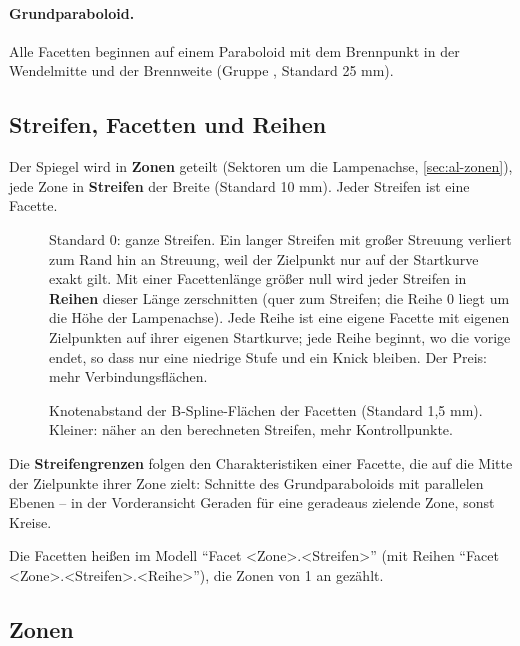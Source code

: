 \paragraph{Grundparaboloid.} Alle Facetten beginnen auf einem Paraboloid mit dem Brennpunkt in der
Wendelmitte und der Brennweite  (Gruppe , Standard 25 mm).

\subsection{Streifen, Facetten und Reihen}\label{sec:al-streifen}

Der Spiegel wird in \textbf{Zonen} geteilt (Sektoren um die Lampenachse, \autoref{sec:al-zonen}),
jede Zone in \textbf{Streifen} der Breite  (Standard 10 mm). Jeder Streifen ist eine
Facette.

\begin{description}
  \item[] Standard 0: ganze Streifen. Ein langer Streifen mit großer Streuung
    verliert zum Rand hin an Streuung, weil der Zielpunkt nur auf der Startkurve exakt gilt. Mit einer
    Facettenlänge größer null wird jeder Streifen in \textbf{Reihen} dieser Länge zerschnitten (quer
    zum Streifen; die Reihe 0 liegt um die Höhe der Lampenachse). Jede Reihe ist eine eigene Facette
    mit eigenen Zielpunkten auf ihrer eigenen Startkurve; jede Reihe beginnt, wo die vorige endet, so
    dass nur eine niedrige Stufe und ein Knick bleiben. Der Preis: mehr Verbindungsflächen.
  \item[] Knotenabstand der B-Spline-Flächen der Facetten (Standard
    1,5 mm). Kleiner: näher an den berechneten Streifen, mehr Kontrollpunkte.
\end{description}

Die \textbf{Streifengrenzen} folgen den Charakteristiken einer Facette, die auf die Mitte der
Zielpunkte ihrer Zone zielt: Schnitte des Grundparaboloids mit parallelen Ebenen -- in der
Vorderansicht Geraden für eine geradeaus zielende Zone, sonst Kreise.

Die Facetten heißen im Modell \enquote{Facet <Zone>.<Streifen>} (mit Reihen
\enquote{Facet <Zone>.<Streifen>.<Reihe>}), die Zonen von 1 an gezählt.

\subsection{Zonen}\label{sec:al-zonen}

